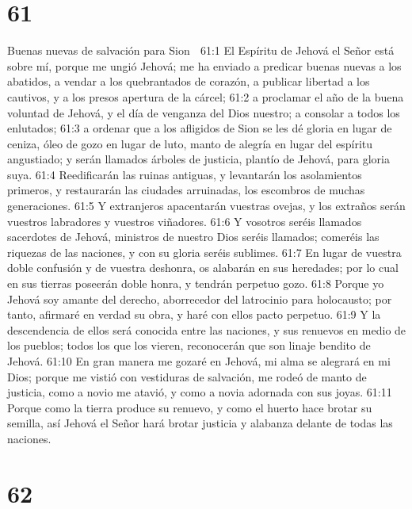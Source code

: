 \chapter{61}

Buenas nuevas de salvación para Sion  

61:1 El Espíritu de Jehová el Señor está sobre mí, porque me ungió Jehová; me ha enviado a predicar buenas nuevas a los abatidos, a vendar a los quebrantados de corazón, a publicar libertad a los cautivos, y a los presos apertura de la cárcel;  
61:2 a proclamar el año de la buena voluntad de Jehová, y el día de venganza del Dios nuestro; a consolar a todos los enlutados; 
61:3 a ordenar que a los afligidos de Sion se les dé gloria en lugar de ceniza, óleo de gozo en lugar de luto, manto de alegría en lugar del espíritu angustiado; y serán llamados árboles de justicia, plantío de Jehová, para gloria suya.  
61:4 Reedificarán las ruinas antiguas, y levantarán los asolamientos primeros, y restaurarán las ciudades arruinadas, los escombros de muchas generaciones.  
61:5 Y extranjeros apacentarán vuestras ovejas, y los extraños serán vuestros labradores y vuestros viñadores.  
61:6 Y vosotros seréis llamados sacerdotes de Jehová, ministros de nuestro Dios seréis llamados; comeréis las riquezas de las naciones, y con su gloria seréis sublimes.  
61:7 En lugar de vuestra doble confusión y de vuestra deshonra, os alabarán en sus heredades; por lo cual en sus tierras poseerán doble honra, y tendrán perpetuo gozo.  
61:8 Porque yo Jehová soy amante del derecho, aborrecedor del latrocinio para holocausto; por tanto, afirmaré en verdad su obra, y haré con ellos pacto perpetuo.  
61:9 Y la descendencia de ellos será conocida entre las naciones, y sus renuevos en medio de los pueblos; todos los que los vieren, reconocerán que son linaje bendito de Jehová. 
61:10 En gran manera me gozaré en Jehová, mi alma se alegrará en mi Dios; porque me vistió con vestiduras de salvación, me rodeó de manto de justicia, como a novio me atavió, y como a novia adornada con sus joyas. 
61:11 Porque como la tierra produce su renuevo, y como el huerto hace brotar su semilla, así Jehová el Señor hará brotar justicia y alabanza delante de todas las naciones.  

\chapter{62}

